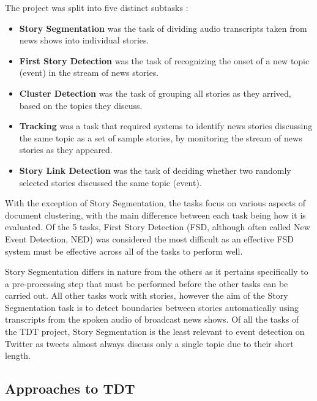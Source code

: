 The project was split into five distinct subtasks \citep{Allan:2002:ITD:772260.772262}:

\begin{itemize}
\item \textbf{Story Segmentation} was the task of dividing audio transcripts taken from news shows into individual stories.

\item \textbf{First Story Detection} was the task of recognizing the onset of a new topic (event) in the stream of news stories.

\item \textbf{Cluster Detection} was the task of grouping all stories as they arrived, based on the topics they discuss.

\item \textbf{Tracking} was a task that required systems to identify news stories  discussing the same topic as a set of sample stories, by monitoring the stream of news stories as they appeared.

\item \textbf{Story Link Detection} was the task of deciding whether two randomly selected stories discussed the same topic (event).
\end{itemize}

With the exception of Story Segmentation, the tasks focus on various aspects of document clustering, with the main difference between each task being how it is evaluated.
Of the 5 tasks, First Story Detection (FSD, although often called New Event Detection, NED) was considered the most difficult \citep{Allan:2000:FSD:354756.354843} as an effective FSD system must be effective across all of the tasks to perform well.

Story Segmentation differs in nature from the others as it pertains specifically to a pre-processing step that must be performed before the other tasks can be carried out.
All other tasks work with stories, however the aim of the Story Segmentation task is to detect boundaries between stories automatically using transcripts from the spoken audio of broadcast news shows.
Of all the tasks of the TDT project, Story Segmentation is the least relevant to event detection on Twitter as tweets almost always discuss only a single topic due to their short length.

\subsection{Approaches to TDT}
\label{background:sec:tdt}

